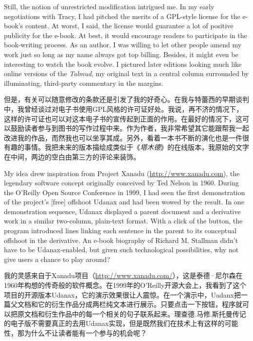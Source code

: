 \ifdefined\eng
Still, the notion of unrestricted modification intrigued me. In my early negotiations with Tracy, I had pitched the merits of a GPL-style license for the e-book's content. At worst, I said, the license would guarantee a lot of positive publicity for the e-book. At best, it would encourage readers to participate in the book-writing process. As an author, I was willing to let other people amend my work just so long as my name always got top billing. Besides, it might even be interesting to watch the book evolve. I pictured later editions looking much like online versions of the \textit{Talmud}, my original text in a central column surrounded by illuminating, third-party commentary in the margins.
\fi

\ifdefined\chs
但是，有关可以随意修改的条款还是引发了我的好奇心。在我与特蕾西的早期谈判中，我曾经谈过对电子书使用GPL风格的许可证好处。我说，再不济的情况下，这样的许可证也可以对这本电子书的宣传起到正面的作用。在最好的情况下，这可以鼓励读者参与到图书的写作过程中来。作为作者，我非常希望其它能跟帮我一起改进我的作品，而然我也可以坐享其成。另外，看着一本书不断的演化也是一件很有趣的事情。我把未来的版本描绘成类似于《\textit{塔木德}》的在线版本，我原始的文字在中间，两边的空白由第三方的评论来装饰。
\fi

\ifdefined\eng
My idea drew inspiration from Project Xanadu (\url{http://www.xanadu.com}), the legendary software concept originally conceived by Ted Nelson in 1960. During the O'Reilly Open Source Conference in 1999, I had seen the first demonstration of the project's [free] offshoot Udanax and had been wowed by the result. In one demonstration sequence, Udanax displayed a parent document and a derivative work in a similar two-column, plain-text format. With a click of the button, the program introduced lines linking each sentence in the parent to its conceptual offshoot in the derivative. An e-book biography of Richard M. Stallman didn't have to be Udanax-enabled, but given such technological possibilities, why not give users a chance to play around?
\fi

\ifdefined\chs
我的灵感来自于Xanadu项目（\url{http://www.xanadu.com/}），这是泰德·尼尔森在1960年构想的传奇般的软件概念。在1999年的O'Reilly开源大会上，我看到了这个项目的开源版本Udanax，它的演示效果很让人震惊。在一个演示中，Uadanx把一篇父文档和它的衍生作品分成两栏纯文本进行展示。只要点击一下按钮，程序就可以把原文档和衍生作品中的每一个相关的句子联系起来。理查德.马修.斯托曼传记的电子版不需要真正的去用Udanax实现，但是既然我们在技术上有这样的可能性，那为什么不让读者能有一个参与的机会呢？
\fi

